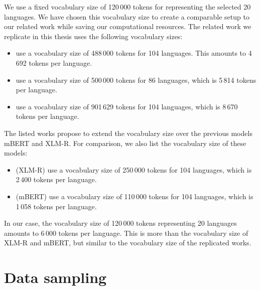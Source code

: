 We use a fixed vocabulary size of 120\,000 tokens for representing the selected 20 languages. We have chosen this vocabulary size to create a comparable setup to our related work while saving our computational resources. The related work we replicate in this thesis uses the following vocabulary sizes:

\begin{itemize}
    \item \citet{chung_improving_2020} use a vocabulary size of 488\,000 tokens for 104 languages. This amounts to 4\,692 tokens per language.
    \item \citet{zheng_allocating_2021} use a vocabulary size of 500\,000 tokens for 86 languages, which is 5\,814 tokens per language.
    \item \citet{liang_xlm-v_2023} use a vocabulary size of 901\,629 tokens for 104 languages, which is 8\,670 tokens per language.
\end{itemize}

The listed works propose to extend the vocabulary size over the previous models mBERT and XLM-R. For comparison, we also list the vocabulary size of these models:

\begin{itemize}
    \item \citet{conneau_unsupervised_2020-1} (XLM-R) use a vocabulary size of 250\,000 tokens for 104 languages, which is 2\,400 tokens per language.
    \item \citet{devlin_bert_2019} (mBERT) use a vocabulary size of 110\,000 tokens for 104 languages, which is 1\,058 tokens per language.
\end{itemize}

In our case, the vocabulary size of 120\,000 tokens representing 20 languages amounts to 6\,000 tokens per language. This is more than the vocabulary size of XLM-R and mBERT, but similar to the vocabulary size of the replicated works. 

\section{Data sampling}
\label{sec:data_sampling}


